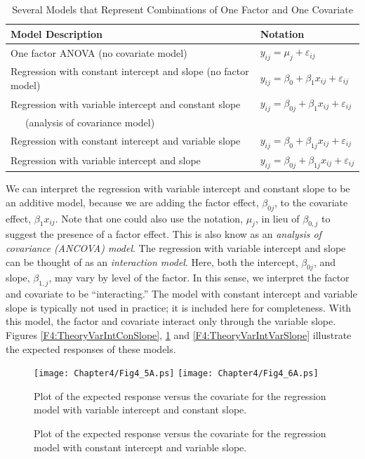  \begin{center}  \begin{table}[h]
\caption{\label{T4:OneFactorCovariate}  Several Models that
Represent Combinations of One Factor and One Covariate}
\begin{tabular}{ll}
\hline Model Description & Notation \\ \hline One factor ANOVA (no
covariate model) &
$y_{ij}=\mu_{j}+\varepsilon_{ij}$ \\
Regression with constant intercept and slope (no factor
model) & $y_{ij}=\beta_0+\beta_1x_{ij}+\varepsilon_{ij}$ \\
Regression with variable intercept and constant slope &
$y_{ij}=\beta_{0j}+\beta_1x_{ij}+\varepsilon_{ij}$ \\
~~~(analysis of covariance model) &  \\
Regression with constant intercept and variable slope &
$y_{ij}=\beta_0+\beta_{1j}x_{ij}+\varepsilon_{ij}$ \\
Regression with variable intercept and slope &
$y_{ij}=\beta_{0j}+\beta_{1j}x_{ij}+\varepsilon_{ij}$ \\
\hline
\end{tabular}
\end{table}  \end{center}  

We can interpret the regression with variable intercept and constant
slope to be an additive model, because we are adding the factor
effect, $\beta_{0j}$, to the covariate effect, $\beta_1x_{ij}$. Note
that one could also use the notation, $\mu_{j}$, in lieu of $\beta
_{0,j}$ to suggest the presence of a factor effect. This is also
know as an \emph{analysis of covariance (ANCOVA) model}. The
regression with variable intercept and slope can be thought of as an
\emph{interaction model}. Here, both the intercept, $\beta_{0j}$,
and slope, $\beta_{1,j}$, may vary by level of the factor. In this
sense, we interpret the factor and covariate to be ``interacting.''
The model with constant intercept and variable slope is typically
not used in practice; it is included here for completeness. With
this model, the factor and covariate interact only through the
variable slope. Figures \ref{F4:TheoryVarIntConSlope},
\ref{F4:TheoryConIntVarSlope} and \ref{F4:TheoryVarIntVarSlope}
illustrate the expected responses of these models.



\begin{figure}[htp]
  \begin{center}
    \texttt{[image: Chapter4/Fig4\_5A.ps]}
    \texttt{[image: Chapter4/Fig4\_6A.ps]} \hfill
     \parbox[t]{2.5in}{\caption{\label{F4:TheoryVarIntConSlope} \small  Plot of the expected response versus the covariate for the regression model
with variable intercept and constant slope.}} \hfill
    \parbox[t]{2.5in}{\caption{\label{F4:TheoryConIntVarSlope} \small  Plot of the expected response versus the covariate for the regression model
with constant intercept and variable slope.}}
  \end{center}
\end{figure}


